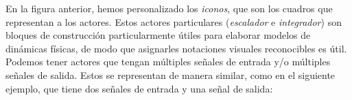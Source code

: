 \documentclass[12pt,a4paper]{article}
\begin{document}
\newpage


\thispagestyle{fancy}
\fancyhf{} 
\fancyhead[R]{\textit{\textcolor{black}{2. DINÁMICA CONTINUA}}}

En la figura anterior, hemos personalizado los \textit{iconos}, que son los cuadros que representan 
a los actores. Estos actores particulares (\textit{escalador} e \textit{integrador}) son bloques 
de construcción particularmente útiles para elaborar modelos de dinámicas físicas, de modo que 
asignarles notaciones visuales reconocibles es útil.
Podemos tener actores que tengan múltiples señales de entrada y/o múltiples señales de salida. 
Estos se representan de manera similar, como en el siguiente ejemplo, que tiene dos señales de 
entrada y una señal de salida:
\end{document}
